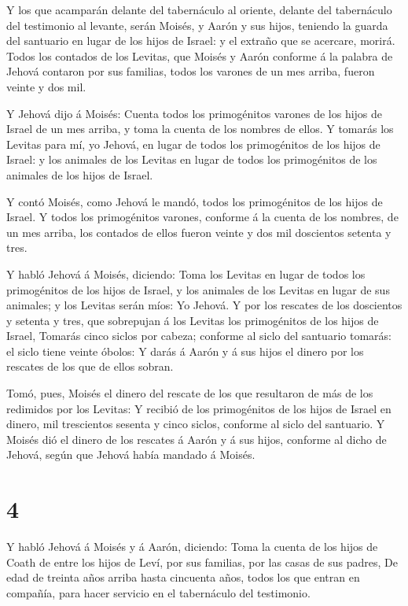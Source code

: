  Y los que acamparán delante del tabernáculo al oriente,
delante del tabernáculo del testimonio al levante, serán Moisés, y Aarón
y sus hijos, teniendo la guarda del santuario en lugar de los hijos de
Israel: y el extraño que se acercare, morirá.  Todos los
contados de los Levitas, que Moisés y Aarón conforme á la palabra de
Jehová contaron por sus familias, todos los varones de un mes arriba,
fueron veinte y dos mil.

 Y Jehová dijo á Moisés: Cuenta todos los primogénitos
varones de los hijos de Israel de un mes arriba, y toma la cuenta de los
nombres de ellos.  Y tomarás los Levitas para mí, yo
Jehová, en lugar de todos los primogénitos de los hijos de Israel: y los
animales de los Levitas en lugar de todos los primogénitos de los
animales de los hijos de Israel.

 Y contó Moisés, como Jehová le mandó, todos los
primogénitos de los hijos de Israel.  Y todos los
primogénitos varones, conforme á la cuenta de los nombres, de un mes
arriba, los contados de ellos fueron veinte y dos mil doscientos setenta
y tres.

 Y habló Jehová á Moisés, diciendo:  Toma los
Levitas en lugar de todos los primogénitos de los hijos de Israel, y los
animales de los Levitas en lugar de sus animales; y los Levitas serán
míos: Yo Jehová.  Y por los rescates de los doscientos y
setenta y tres, que sobrepujan á los Levitas los primogénitos de los
hijos de Israel,  Tomarás cinco siclos por cabeza; conforme
al siclo del santuario tomarás: el siclo tiene veinte óbolos:
 Y darás á Aarón y á sus hijos el dinero por los rescates
de los que de ellos sobran.

 Tomó, pues, Moisés el dinero del rescate de los que
resultaron de más de los redimidos por los Levitas:  Y
recibió de los primogénitos de los hijos de Israel en dinero, mil
trescientos sesenta y cinco siclos, conforme al siclo del santuario.
 Y Moisés dió el dinero de los rescates á Aarón y á sus
hijos, conforme al dicho de Jehová, según que Jehová había mandado á
Moisés.

\hypertarget{section-3}{%
\section{4}\label{section-3}}

 Y habló Jehová á Moisés y á Aarón, diciendo: 
Toma la cuenta de los hijos de Coath de entre los hijos de Leví, por sus
familias, por las casas de sus padres,  De edad de treinta
años arriba hasta cincuenta años, todos los que entran en compañía, para
hacer servicio en el tabernáculo del testimonio.

